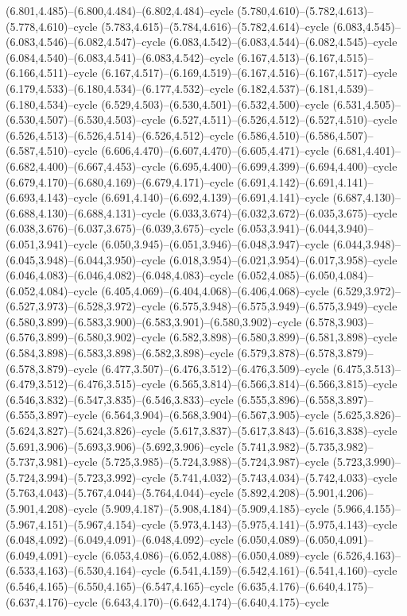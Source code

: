 (6.801,4.485)--(6.800,4.484)--(6.802,4.484)--cycle (5.780,4.610)--(5.782,4.613)--(5.778,4.610)--cycle (5.783,4.615)--(5.784,4.616)--(5.782,4.614)--cycle (6.083,4.545)--(6.083,4.546)--(6.082,4.547)--cycle (6.083,4.542)--(6.083,4.544)--(6.082,4.545)--cycle (6.084,4.540)--(6.083,4.541)--(6.083,4.542)--cycle (6.167,4.513)--(6.167,4.515)--(6.166,4.511)--cycle (6.167,4.517)--(6.169,4.519)--(6.167,4.516)--(6.167,4.517)--cycle (6.179,4.533)--(6.180,4.534)--(6.177,4.532)--cycle (6.182,4.537)--(6.181,4.539)--(6.180,4.534)--cycle (6.529,4.503)--(6.530,4.501)--(6.532,4.500)--cycle (6.531,4.505)--(6.530,4.507)--(6.530,4.503)--cycle (6.527,4.511)--(6.526,4.512)--(6.527,4.510)--cycle (6.526,4.513)--(6.526,4.514)--(6.526,4.512)--cycle (6.586,4.510)--(6.586,4.507)--(6.587,4.510)--cycle (6.606,4.470)--(6.607,4.470)--(6.605,4.471)--cycle (6.681,4.401)--(6.682,4.400)--(6.667,4.453)--cycle (6.695,4.400)--(6.699,4.399)--(6.694,4.400)--cycle (6.679,4.170)--(6.680,4.169)--(6.679,4.171)--cycle (6.691,4.142)--(6.691,4.141)--(6.693,4.143)--cycle (6.691,4.140)--(6.692,4.139)--(6.691,4.141)--cycle (6.687,4.130)--(6.688,4.130)--(6.688,4.131)--cycle (6.033,3.674)--(6.032,3.672)--(6.035,3.675)--cycle (6.038,3.676)--(6.037,3.675)--(6.039,3.675)--cycle (6.053,3.941)--(6.044,3.940)--(6.051,3.941)--cycle (6.050,3.945)--(6.051,3.946)--(6.048,3.947)--cycle (6.044,3.948)--(6.045,3.948)--(6.044,3.950)--cycle (6.018,3.954)--(6.021,3.954)--(6.017,3.958)--cycle (6.046,4.083)--(6.046,4.082)--(6.048,4.083)--cycle (6.052,4.085)--(6.050,4.084)--(6.052,4.084)--cycle (6.405,4.069)--(6.404,4.068)--(6.406,4.068)--cycle (6.529,3.972)--(6.527,3.973)--(6.528,3.972)--cycle (6.575,3.948)--(6.575,3.949)--(6.575,3.949)--cycle (6.580,3.899)--(6.583,3.900)--(6.583,3.901)--(6.580,3.902)--cycle (6.578,3.903)--(6.576,3.899)--(6.580,3.902)--cycle (6.582,3.898)--(6.580,3.899)--(6.581,3.898)--cycle (6.584,3.898)--(6.583,3.898)--(6.582,3.898)--cycle (6.579,3.878)--(6.578,3.879)--(6.578,3.879)--cycle (6.477,3.507)--(6.476,3.512)--(6.476,3.509)--cycle (6.475,3.513)--(6.479,3.512)--(6.476,3.515)--cycle (6.565,3.814)--(6.566,3.814)--(6.566,3.815)--cycle (6.546,3.832)--(6.547,3.835)--(6.546,3.833)--cycle (6.555,3.896)--(6.558,3.897)--(6.555,3.897)--cycle (6.564,3.904)--(6.568,3.904)--(6.567,3.905)--cycle (5.625,3.826)--(5.624,3.827)--(5.624,3.826)--cycle (5.617,3.837)--(5.617,3.843)--(5.616,3.838)--cycle (5.691,3.906)--(5.693,3.906)--(5.692,3.906)--cycle (5.741,3.982)--(5.735,3.982)--(5.737,3.981)--cycle (5.725,3.985)--(5.724,3.988)--(5.724,3.987)--cycle (5.723,3.990)--(5.724,3.994)--(5.723,3.992)--cycle (5.741,4.032)--(5.743,4.034)--(5.742,4.033)--cycle (5.763,4.043)--(5.767,4.044)--(5.764,4.044)--cycle (5.892,4.208)--(5.901,4.206)--(5.901,4.208)--cycle (5.909,4.187)--(5.908,4.184)--(5.909,4.185)--cycle (5.966,4.155)--(5.967,4.151)--(5.967,4.154)--cycle (5.973,4.143)--(5.975,4.141)--(5.975,4.143)--cycle (6.048,4.092)--(6.049,4.091)--(6.048,4.092)--cycle (6.050,4.089)--(6.050,4.091)--(6.049,4.091)--cycle (6.053,4.086)--(6.052,4.088)--(6.050,4.089)--cycle (6.526,4.163)--(6.533,4.163)--(6.530,4.164)--cycle (6.541,4.159)--(6.542,4.161)--(6.541,4.160)--cycle (6.546,4.165)--(6.550,4.165)--(6.547,4.165)--cycle (6.635,4.176)--(6.640,4.175)--(6.637,4.176)--cycle (6.643,4.170)--(6.642,4.174)--(6.640,4.175)--cycle 